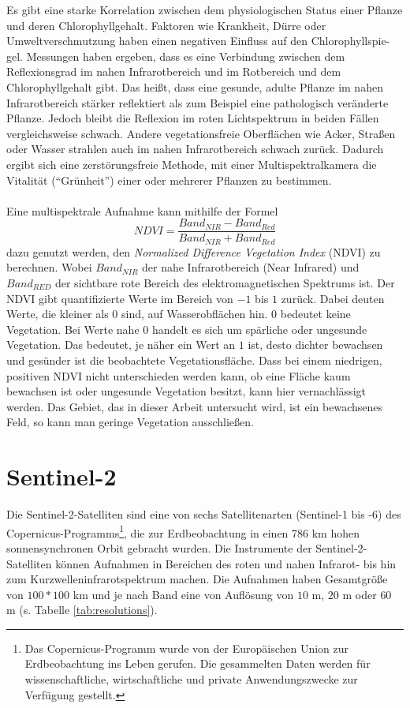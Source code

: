 Es gibt eine starke Korrelation zwischen dem physiologischen Status einer Pflanze und deren Chlorophyllgehalt. Faktoren wie Krankheit, Dürre oder Umweltverschmutzung haben einen negativen Einfluss auf den Chlorophyllspie-gel.\cite[S. 279ff.]{ref:hendry} Messungen haben ergeben, dass es eine Verbindung zwischen dem Reflexionsgrad im nahen Infrarotbereich und im Rotbereich und dem Chlorophyllgehalt gibt. Das heißt, dass eine gesunde, adulte Pflanze im nahen Infrarotbereich stärker reflektiert als zum Beispiel eine pathologisch veränderte Pflanze. Jedoch bleibt die Reflexion im roten Lichtspektrum in beiden Fällen vergleichsweise schwach. Andere vegetationsfreie Oberflächen wie Acker, Straßen oder Wasser strahlen auch im nahen Infrarotbereich schwach zurück. Dadurch ergibt sich eine zerstörungsfreie Methode, mit einer Multispektralkamera die Vitalität ("`Grünheit"') einer oder mehrerer Pflanzen zu bestimmen.\cite[S. 277ff.]{ref:anatoly} \\\\
Eine multispektrale Aufnahme kann mithilfe der Formel 
\begin{equation}\label{equation:ndvi}
	NDVI = \frac{Band_{NIR} - Band_{Red}} {Band_{NIR} + Band_{Red}}
\end{equation}
dazu genutzt werden, den \textit{Normalized Difference Vegetation Index} (NDVI) zu berechnen. Wobei $Band_{NIR}$ der nahe Infrarotbereich (Near Infrared) und $Band_{RED}$ der sichtbare rote Bereich des elektromagnetischen Spektrums ist. Der NDVI gibt quantifizierte Werte im Bereich von $-1$ bis $1$ zurück. Dabei deuten Werte, die kleiner als $0$ sind, auf Wasserobflächen hin. $0$ bedeutet keine Vegetation. Bei Werte nahe $0$ handelt es sich um spärliche oder ungesunde Vegetation. Das bedeutet, je näher ein Wert an $1$ ist, desto dichter bewachsen und gesünder ist die beobachtete Vegetationsfläche.\cite{ref:nasa} Dass bei einem niedrigen, positiven NDVI nicht unterschieden werden kann, ob eine Fläche kaum bewachsen ist oder ungesunde Vegetation besitzt, kann hier vernachlässigt werden. Das Gebiet, das in dieser Arbeit untersucht wird, ist ein bewachsenes Feld, so kann man geringe Vegetation ausschließen.

\section{Sentinel-2}\label{sec:sentinel2}

Die Sentinel-2-Satelliten sind eine von sechs Satellitenarten (Sentinel-1 bis -6) des Copernicus-Programms\footnote{Das Copernicus-Programm wurde von der Europäischen Union zur Erdbeobachtung ins Leben gerufen. Die gesammelten Daten werden für wissenschaftliche, wirtschaftliche und private Anwendungszwecke zur Verfügung gestellt.\cite{ref:copernicus}}, die zur Erdbeobachtung in einen 786 km hohen sonnensynchronen Orbit gebracht wurden. Die Instrumente der Sentinel-2-Satelliten können Aufnahmen in Bereichen des roten und nahen Infrarot- bis hin zum Kurzwelleninfrarotspektrum machen. Die Aufnahmen haben Gesamtgröße von $100*100$ km und je nach Band eine von Auflösung von $10$ m, $20$ m oder $60$ m (s. Tabelle \ref{tab:resolutions}).

